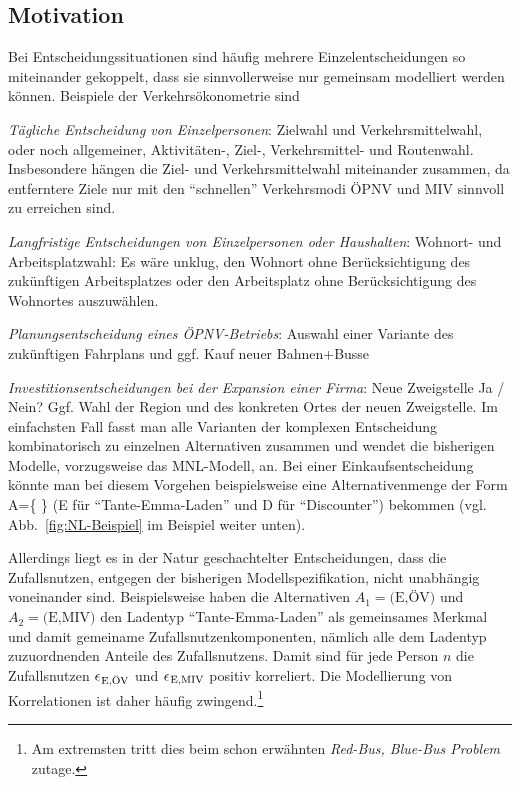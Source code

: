 \subsection{Motivation}

Bei Entscheidungssituationen sind h\"aufig mehrere
Einzelentscheidungen so miteinander gekoppelt, dass sie
sinnvollerweise nur gemeinsam
modelliert werden k\"onnen. Beispiele der Verkehrs\"okonometrie sind
\bi
\item \emph{T\"agliche Entscheidung von Einzelpersonen}:
Zielwahl und Verkehrsmittelwahl, oder noch allgemeiner,
Aktivit\"aten-, Ziel-, Verkehrsmittel- und Routenwahl. Insbesondere
h\"angen die Ziel- und Verkehrsmittelwahl miteinander zusammen, da
entferntere Ziele nur mit den ``schnellen'' Verkehrsmodi \"OPNV und
MIV sinnvoll zu erreichen sind.
\item \emph{Langfristige Entscheidungen von Einzelpersonen oder
Haushalten}: 
Wohnort- und Arbeitsplatzwahl: Es w\"are unklug, den Wohnort
ohne Ber\"ucksichtigung des zu\-k\"unf\-ti\-gen Arbeitsplatzes oder den
Arbeitsplatz ohne Ber\"ucksichtigung des Wohnortes auszuw\"ahlen.
\item \emph{Planungsentscheidung eines \"OPNV-Betriebs}:
Auswahl einer Variante des zu\-k\"unf\-ti\-gen Fahrplans und ggf. Kauf neuer
Bahnen+Busse
\item \emph{Investitionsentscheidungen bei der Expansion einer Firma}:
Neue Zweigstelle Ja / Nein? Ggf. Wahl der Region und des konkreten Ortes
der neuen Zweigstelle.
\ei
Im einfachsten Fall fasst man alle Varianten der komplexen
Entscheidung kombinatorisch zu einzelnen Alternativen zusammen und
wendet die bisherigen Modelle, vorzugsweise das MNL-Modell,
an. Bei einer Einkaufsentscheidung  k\"onnte  man bei diesem Vorgehen 
beispielsweise eine Alternativenmenge der Form 
\be
\label{nestedLogit-A}
A=\{ \}
\ee
(E f\"ur ``Tante-Emma-Laden'' und D f\"ur ``Discounter'') bekommen
(vgl. Abb.~\ref{fig:NL-Beispiel} im Beispiel weiter unten).

Allerdings liegt es in der Natur geschachtelter Entscheidungen, dass
die Zufallsnutzen, entgegen der bisherigen Modellspezifikation, nicht
unabh\"angig voneinander sind. Beispielsweise haben die Alternativen 
$A_1=\text{(E,\"OV)}$ und $A_2=\text{(E,MIV)}$ den Ladentyp
``Tante-Emma-Laden'' als
gemeinsames Merkmal  und damit gemeiname Zufallsnutzenkomponenten,
n\"amlich alle dem Ladentyp zuzuordnenden Anteile des
Zufallsnutzens. Damit sind f\"ur jede Person $n$ die Zufallsnutzen $\epsilon_{\!\!{\mbox{ \scriptsize{E,\"OV}}}}$ und
$\epsilon_{\!\!{\mbox{ \scriptsize{E,MIV}}}}$ positiv korreliert. Die Modellierung von
Korrelationen ist daher h\"aufig
zwingend.\footnote{Am extremsten tritt dies beim schon
erw\"ahnten \textit{Red-Bus, Blue-Bus Problem} zutage.}

